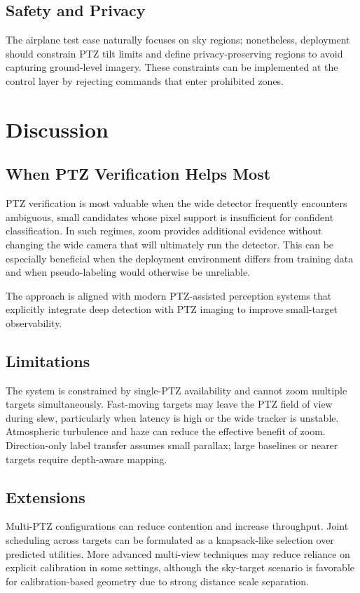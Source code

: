 \documentclass[conf]{new-aiaa}
\begin{document}
{\subsection{Safety and Privacy}
The airplane test case naturally focuses on sky regions; nonetheless, deployment should constrain PTZ tilt limits and define privacy-preserving regions to avoid capturing ground-level imagery. These constraints can be implemented at the control layer by rejecting commands that enter prohibited zones.

\section{Discussion}
\subsection{When PTZ Verification Helps Most}
PTZ verification is most valuable when the wide detector frequently encounters ambiguous, small candidates whose pixel support is insufficient for confident classification. In such regimes, zoom provides additional evidence without changing the wide camera that will ultimately run the detector. This can be especially beneficial when the deployment environment differs from training data and when pseudo-labeling would otherwise be unreliable.
\par
The approach is aligned with modern PTZ-assisted perception systems that explicitly integrate deep detection with PTZ imaging to improve small-target observability.

\subsection{Limitations}
The system is constrained by single-PTZ availability and cannot zoom multiple targets simultaneously. Fast-moving targets may leave the PTZ field of view during slew, particularly when latency is high or the wide tracker is unstable. Atmospheric turbulence and haze can reduce the effective benefit of zoom. Direction-only label transfer assumes small parallax; large baselines or nearer targets require depth-aware mapping.

\subsection{Extensions}
Multi-PTZ configurations can reduce contention and increase throughput. Joint scheduling across targets can be formulated as a knapsack-like selection over predicted utilities. More advanced multi-view techniques may reduce reliance on explicit calibration in some settings, although the sky-target scenario is favorable for calibration-based geometry due to strong distance scale separation.

}
\end{document}
